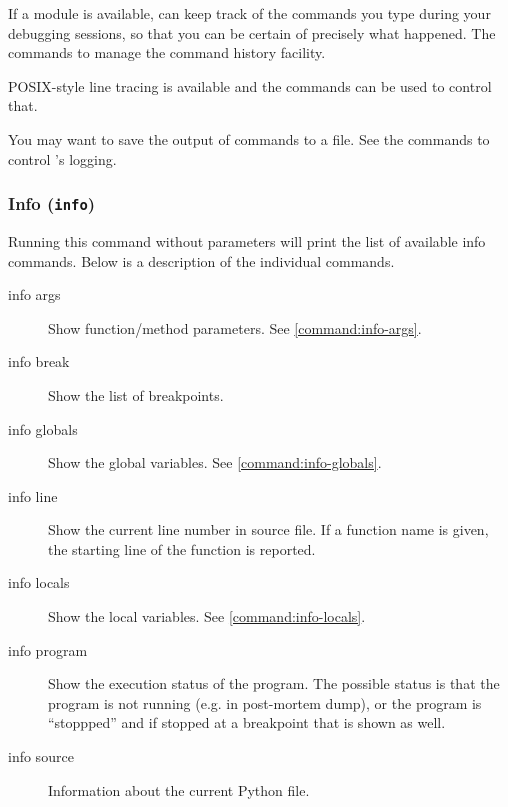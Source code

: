 If a
module is available,  can keep track of the commands you
type during your debugging sessions, so that you can be certain of
precisely what happened.  The  commands to manage
the command history facility.

POSIX-style line tracing is available and the 
commands can be used to control that.

You may want to save the output of  commands to a file.
See the  commands to control 's logging.

\subsubsection{Info ({\tt info})\label{subsubsection-info}}

Running this command without parameters will print the list of
available info commands. Below is a description of the individual
commands.

\begin{description}

\item[info args]

Show function/method parameters. See \ref{command:info-args}.

\item[info break]

Show the list of breakpoints. 

\item[info globals]

Show the global variables. See \ref{command:info-globals}. 

\item[info line]

Show the current line number in source file. If a function name is
given, the starting line of the function is reported.

\item[info locals]

Show the local variables. See \ref{command:info-locals}. 

\item[info program]

Show the execution status of the program. The possible status is that
the program is not running (e.g. in post-mortem dump), or the program is
``stoppped'' and if stopped at a breakpoint that is shown as well.

\item[info source]

Information about the current Python file.

\end{description}

